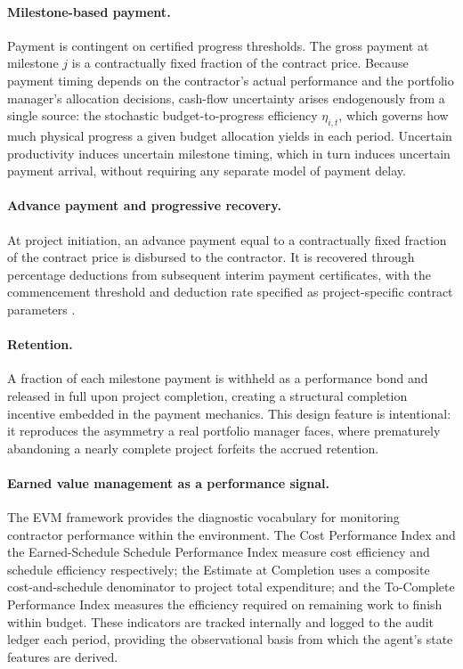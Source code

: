 \paragraph{Milestone-based payment.}
Payment is contingent on certified progress thresholds. The gross
payment at milestone $j$ is a contractually fixed fraction of the
contract price. Because payment timing depends on the contractor's
actual performance and the portfolio manager's allocation decisions,
cash-flow uncertainty arises endogenously from a single source: the
stochastic budget-to-progress efficiency $\eta_{i,t}$, which governs
how much physical progress a given budget allocation yields in each
period. Uncertain productivity induces uncertain milestone timing,
which in turn induces uncertain payment arrival, without requiring any
separate model of payment delay.

\paragraph{Advance payment and progressive recovery.}
At project initiation, an advance payment equal to a contractually
fixed fraction of the contract price is disbursed to the contractor.
It is recovered through percentage deductions from subsequent interim
payment certificates, with the commencement threshold and deduction
rate specified as project-specific contract parameters \citep{FIDIC2017}.

\paragraph{Retention.}
A fraction of each milestone payment is withheld as a performance
bond and released in full upon project completion, creating a
structural completion incentive embedded in the payment mechanics.
This design feature is intentional: it reproduces the asymmetry a
real portfolio manager faces, where prematurely abandoning a nearly
complete project forfeits the accrued retention.

\paragraph{Earned value management as a performance signal.}
The EVM framework \citep{Fleming2010} provides the diagnostic
vocabulary for monitoring contractor performance within the
environment. The Cost Performance Index and the Earned-Schedule
Schedule Performance Index measure cost efficiency and schedule
efficiency respectively; the Estimate at Completion uses a composite
cost-and-schedule denominator to project total expenditure; and the
To-Complete Performance Index measures the efficiency required on
remaining work to finish within budget. These indicators are tracked
internally and logged to the audit ledger each period, providing the
observational basis from which the agent's state features are derived.

